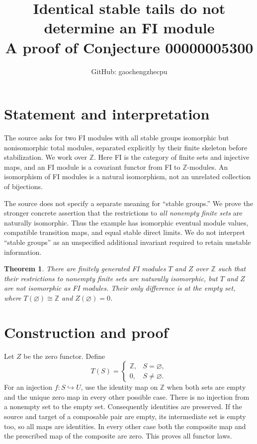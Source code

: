\documentclass[11pt]{article}
\title{Identical stable tails do not determine an FI module\\A proof of Conjecture 00000005300}
\author{GitHub: gaochengzhecpu}
\date{}
\newtheorem{theorem}{Theorem}
\begin{document}
\maketitle

\section*{Statement and interpretation}
The source asks for two FI modules with all stable groups isomorphic but
nonisomorphic total modules, separated explicitly by their finite skeleton
before stabilization. We work over $\mathbb Z$. Here FI is the category of
finite sets and injective maps, and an FI module is a covariant functor
from FI to $\mathbb Z$-modules. An isomorphism of FI modules is a natural
isomorphism, not an unrelated collection of bijections.

The source does not specify a separate meaning for ``stable groups.'' We
prove the stronger concrete assertion that the restrictions to \emph{all
nonempty finite sets} are naturally isomorphic. Thus the example has
isomorphic eventual module values, compatible transition maps, and equal
stable direct limits. We do not interpret ``stable groups'' as an
unspecified additional invariant required to retain unstable information.

\begin{theorem}
There are finitely generated FI modules $T$ and $Z$ over $\mathbb Z$ such
that their restrictions to nonempty finite sets are naturally isomorphic,
but $T$ and $Z$ are not isomorphic as FI modules. Their only difference is
at the empty set, where $T(\varnothing)\cong\mathbb Z$ and
$Z(\varnothing)=0$.
\end{theorem}

\section*{Construction and proof}
Let $Z$ be the zero functor. Define
\[
 T(S)=\begin{cases}\mathbb Z,&S=\varnothing,\\0,&S\ne\varnothing.\end{cases}
\]
For an injection $f:S\hookrightarrow U$, use the identity map on
$\mathbb Z$ when both sets are empty and the unique zero map in every
other possible case. There is no injection from a nonempty set to the
empty set. Consequently identities are preserved. If the source and
target of a composable pair are empty, its intermediate set is empty
too, so all maps are identities. In every other case both the composite
map and the prescribed map of the composite are zero. This proves all
functor laws.
\end{document}
